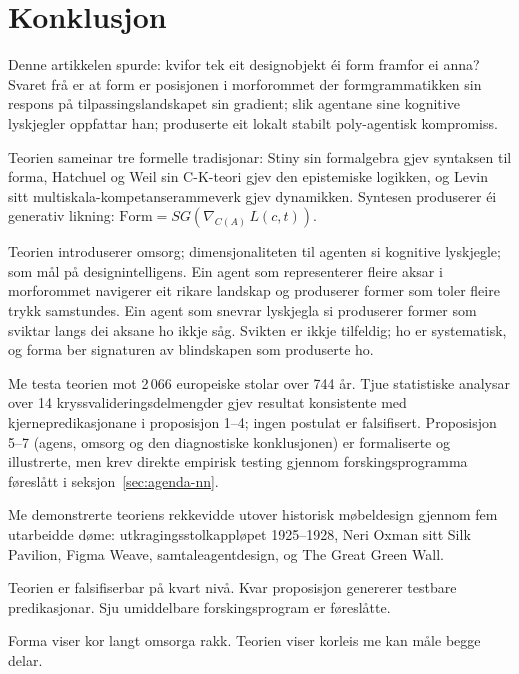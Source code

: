 \section{Konklusjon}
\label{sec:conclusion-nn}

Denne artikkelen spurde: kvifor tek eit designobjekt éi form framfor ei anna? Svaret frå \formlaere{} er at form er posisjonen i morforommet der formgrammatikken sin respons på tilpassingslandskapet sin gradient; slik agentane sine kognitive lyskjegler oppfattar han; produserte eit lokalt stabilt poly-agentisk kompromiss.

Teorien sameinar tre formelle tradisjonar: Stiny sin formalgebra gjev syntaksen til forma, Hatchuel og Weil sin C-K-teori gjev den epistemiske logikken, og Levin sitt multiskala-kompetanserammeverk gjev dynamikken. Syntesen produserer éi generativ likning: $\mathrm{Form} = SG(\nabla_{C(A)}\, L(c,t))$.

Teorien introduserer omsorg; dimensjonaliteten til agenten si kognitive lyskjegle; som mål på designintelligens. Ein agent som representerer fleire aksar i morforommet navigerer eit rikare landskap og produserer former som toler fleire trykk samstundes. Ein agent som snevrar lyskjegla si produserer former som sviktar langs dei aksane ho ikkje såg. Svikten er ikkje tilfeldig; ho er systematisk, og forma ber signaturen av blindskapen som produserte ho.

Me testa teorien mot 2\,066 europeiske stolar over 744 år. Tjue statistiske analysar over 14 kryssvalideringsdelmengder gjev resultat konsistente med kjernepredikasjonane i proposisjon 1--4; ingen postulat er falsifisert. Proposisjon 5--7 (agens, omsorg og den diagnostiske konklusjonen) er formaliserte og illustrerte, men krev direkte empirisk testing gjennom forskingsprogramma føreslått i seksjon~\ref{sec:agenda-nn}.

Me demonstrerte teoriens rekkevidde utover historisk møbeldesign gjennom fem utarbeidde døme: utkragingsstolkappløpet 1925--1928, Neri Oxman sitt Silk Pavilion, Figma Weave, samtaleagentdesign, og The Great Green Wall.

Teorien er falsifiserbar på kvart nivå. Kvar proposisjon genererer testbare predikasjonar. Sju umiddelbare forskingsprogram er føreslåtte.

Forma viser kor langt omsorga rakk. Teorien viser korleis me kan måle begge delar.
